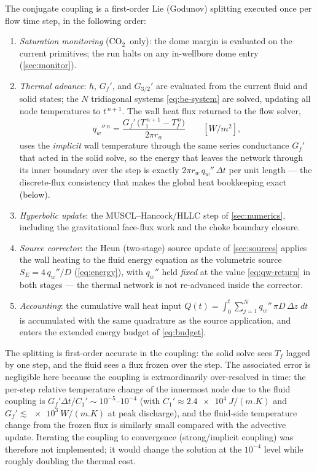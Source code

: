 \documentclass[11pt]{article}
\newcommand{\co}{CO$_2$}
\begin{document}
The conjugate coupling is a first-order Lie (Godunov) splitting
executed once per flow time step, in the following order:
\begin{enumerate}
\item \emph{Saturation monitoring} (\co\ only): the dome margin is
evaluated on the current primitives; the run halts on any
in-wellbore dome entry (\cref{sec:monitor}).
\item \emph{Thermal advance}: $h$, $G_f'$, and $G_{3/2}'$ are
evaluated from the current fluid and solid states; the $N$
tridiagonal systems \eqref{eq:be-system} are solved, updating all
node temperatures to $t^{\,n+1}$. The wall heat flux returned to the
flow solver,
\begin{equation}
q_w''{}^{\,n} = \frac{G_f'\,\bigl(T_1^{\,n+1} - T_f^{\,n}\bigr)}
{2\pi r_w}
\qquad [\si{W/m^2}],
\label{eq:qw-return}
\end{equation}
uses the \emph{implicit} wall temperature through the same series
conductance $G_f'$ that acted in the solid solve, so the energy that
leaves the network through its inner boundary over the step is
exactly $2\pi r_w\,q_w''\,\Delta t$ per unit length --- the
discrete-flux consistency that makes the global heat bookkeeping
exact (below).
\item \emph{Hyperbolic update}: the MUSCL--Hancock/HLLC step of
\cref{sec:numerics}, including the gravitational face-flux work and
the choke boundary closure.
\item \emph{Source corrector}: the Heun (two-stage) source update of
\cref{sec:sources} applies the wall heating to the fluid energy
equation as the volumetric source $S_E = 4\,q_w''/D$
(\cref{eq:energy}), with $q_w''$ held \emph{fixed} at the value
\eqref{eq:qw-return} in both stages --- the thermal network is not
re-advanced inside the corrector.
\item \emph{Accounting}: the cumulative wall heat input
$Q(t) = \int_0^{t} \sum_{j=1}^{N} q_w''\,\pi D\,\Delta z\;dt$
is accumulated with the same quadrature as the source application,
and enters the extended energy budget of \cref{eq:budget}.
\end{enumerate}
The splitting is first-order accurate in the coupling: the solid
solve sees $T_f$ lagged by one step, and the fluid sees a flux frozen
over the step. The associated error is negligible here because the
coupling is extraordinarily over-resolved in time: the per-step
relative temperature change of the innermost node due to the fluid
coupling is $G_f' \Delta t / C_1' \sim 10^{-5}$--$10^{-4}$ (with
$C_1' \approx \SI{2.4e4}{J/(m.K)}$ and $G_f' \lesssim
\SI{e3}{W/(m.K)}$ at peak discharge), and the fluid-side temperature
change from the frozen flux is similarly small compared with the
advective update. Iterating the coupling to convergence
(strong/implicit coupling) was therefore not implemented; it would
change the solution at the $10^{-4}$ level while roughly doubling
the thermal cost.
\end{document}
